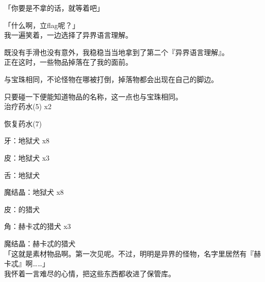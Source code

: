「你要是不拿的话，就等着吧」

「什么啊，立flag呢？」\\

我一遍笑着，一边选择了异界语言理解。

既没有手滑也没有意外，我稳稳当当地拿到了第二个『异界语言理解』。\\

正在这时，一些物品掉落在了我的面前。

与宝珠相同，不论怪物在哪被打倒，掉落物都会出现在自己的脚边。

只要碰一下便能知道物品的名称，这一点也与宝珠相同。\\

治疗药水(5) x2

恢复药水(7)

牙：地狱犬 x8

皮：地狱犬 x3

舌：地狱犬

魔结晶：地狱犬 x8

皮：的猎犬

角：赫卡忒的猎犬 x3

魔结晶：赫卡忒的猎犬\\

「这就是素材物品啊。第一次见呢。不过，明明是异界的怪物，名字里居然有『赫卡忒』啊……」\\

我怀着一言难尽的心情，把这些东西都收进了保管库。\\
